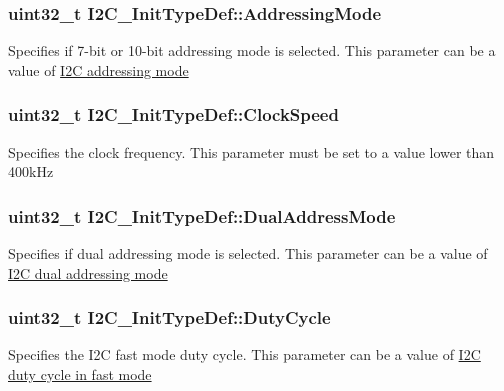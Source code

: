 \subsubsection[{\texorpdfstring{Addressing\+Mode}{AddressingMode}}]{\setlength{\rightskip}{0pt plus 5cm}uint32\+\_\+t I2\+C\+\_\+\+Init\+Type\+Def\+::\+Addressing\+Mode}\hypertarget{struct_i2_c___init_type_def_a5c39c41a5ee892c1bce69a579cc017ca}{}\label{struct_i2_c___init_type_def_a5c39c41a5ee892c1bce69a579cc017ca}
Specifies if 7-\/bit or 10-\/bit addressing mode is selected. This parameter can be a value of \hyperlink{group___i2_c__addressing__mode}{I2C addressing mode} 
\subsubsection[{\texorpdfstring{Clock\+Speed}{ClockSpeed}}]{\setlength{\rightskip}{0pt plus 5cm}uint32\+\_\+t I2\+C\+\_\+\+Init\+Type\+Def\+::\+Clock\+Speed}\hypertarget{struct_i2_c___init_type_def_a45f1209e7e43e55f055bd9ead064230a}{}\label{struct_i2_c___init_type_def_a45f1209e7e43e55f055bd9ead064230a}
Specifies the clock frequency. This parameter must be set to a value lower than 400k\+Hz 
\subsubsection[{\texorpdfstring{Dual\+Address\+Mode}{DualAddressMode}}]{\setlength{\rightskip}{0pt plus 5cm}uint32\+\_\+t I2\+C\+\_\+\+Init\+Type\+Def\+::\+Dual\+Address\+Mode}\hypertarget{struct_i2_c___init_type_def_add6a6b87ee067d33c94c554288736d40}{}\label{struct_i2_c___init_type_def_add6a6b87ee067d33c94c554288736d40}
Specifies if dual addressing mode is selected. This parameter can be a value of \hyperlink{group___i2_c__dual__addressing__mode}{I2C dual addressing mode} 
\subsubsection[{\texorpdfstring{Duty\+Cycle}{DutyCycle}}]{\setlength{\rightskip}{0pt plus 5cm}uint32\+\_\+t I2\+C\+\_\+\+Init\+Type\+Def\+::\+Duty\+Cycle}\hypertarget{struct_i2_c___init_type_def_a91eb2f998ac771478ec0f44ac73c32dd}{}\label{struct_i2_c___init_type_def_a91eb2f998ac771478ec0f44ac73c32dd}
Specifies the I2C fast mode duty cycle. This parameter can be a value of \hyperlink{group___i2_c__duty__cycle__in__fast__mode}{I2C duty cycle in fast mode} 
